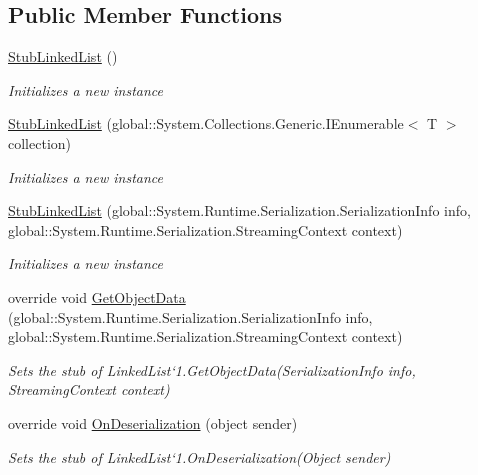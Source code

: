 \subsection*{Public Member Functions}
\begin{DoxyCompactItemize}
\item 
\hyperlink{class_system_1_1_collections_1_1_generic_1_1_fakes_1_1_stub_linked_list_3_01_t_01_4_abaf9471542afbcded6e1022f4312ee3d}{Stub\-Linked\-List} ()
\begin{DoxyCompactList}\small\item\em Initializes a new instance\end{DoxyCompactList}\item 
\hyperlink{class_system_1_1_collections_1_1_generic_1_1_fakes_1_1_stub_linked_list_3_01_t_01_4_a0aa930f1ebb0936392290d039e1d8f93}{Stub\-Linked\-List} (global\-::\-System.\-Collections.\-Generic.\-I\-Enumerable$<$ T $>$ collection)
\begin{DoxyCompactList}\small\item\em Initializes a new instance\end{DoxyCompactList}\item 
\hyperlink{class_system_1_1_collections_1_1_generic_1_1_fakes_1_1_stub_linked_list_3_01_t_01_4_aaadfb8715fd27c815a47a70fa45ba77e}{Stub\-Linked\-List} (global\-::\-System.\-Runtime.\-Serialization.\-Serialization\-Info info, global\-::\-System.\-Runtime.\-Serialization.\-Streaming\-Context context)
\begin{DoxyCompactList}\small\item\em Initializes a new instance\end{DoxyCompactList}\item 
override void \hyperlink{class_system_1_1_collections_1_1_generic_1_1_fakes_1_1_stub_linked_list_3_01_t_01_4_a632d9cf51ca161c7f229ff16064bdfc6}{Get\-Object\-Data} (global\-::\-System.\-Runtime.\-Serialization.\-Serialization\-Info info, global\-::\-System.\-Runtime.\-Serialization.\-Streaming\-Context context)
\begin{DoxyCompactList}\small\item\em Sets the stub of Linked\-List`1.Get\-Object\-Data(\-Serialization\-Info info, Streaming\-Context context)\end{DoxyCompactList}\item 
override void \hyperlink{class_system_1_1_collections_1_1_generic_1_1_fakes_1_1_stub_linked_list_3_01_t_01_4_ae521f93786963ddab676d53dee542c36}{On\-Deserialization} (object sender)
\begin{DoxyCompactList}\small\item\em Sets the stub of Linked\-List`1.On\-Deserialization(\-Object sender)\end{DoxyCompactList}\end{DoxyCompactItemize}
